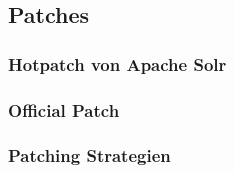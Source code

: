 
\subsection{Patches}\label{subsec:patches}

\subsubsection{Hotpatch von Apache Solr}
\subsubsection{Official Patch}
\subsubsection{Patching Strategien}
